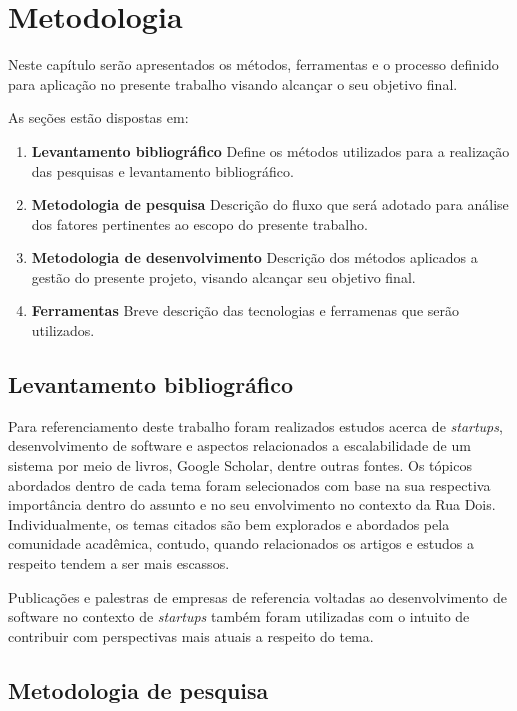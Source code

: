 \chapter{Metodologia}
\label{sec:Metodologia}

Neste capítulo serão apresentados os métodos, ferramentas e o processo definido
para aplicação no presente trabalho visando alcançar o seu objetivo final.

  As seções estão dispostas em:

  \begin{enumerate}
    \item \textbf{Levantamento bibliográfico} Define os métodos utilizados para
    a realização das pesquisas e levantamento bibliográfico.
    \item \textbf{Metodologia de pesquisa} Descrição do fluxo que será
    adotado para análise dos fatores pertinentes ao escopo do presente trabalho.
    \item \textbf{Metodologia de desenvolvimento} Descrição dos métodos
    aplicados a gestão do presente projeto, visando alcançar seu objetivo final.
    \item \textbf{Ferramentas} Breve descrição das tecnologias e ferramenas
    que serão utilizados.
  \end{enumerate}

\section{Levantamento bibliográfico}

Para referenciamento deste trabalho foram realizados estudos acerca de
\textit{startups}, desenvolvimento de software e aspectos relacionados
a escalabilidade de um sistema por meio de livros, Google Scholar, dentre
outras fontes. Os tópicos abordados dentro de cada tema foram selecionados
com base na sua respectiva importância dentro do assunto e no seu envolvimento
no contexto da Rua Dois. Individualmente, os temas citados são bem explorados e
abordados pela comunidade acadêmica, contudo, quando relacionados os artigos e
estudos a respeito tendem a ser mais escassos.

Publicações e palestras de empresas de referencia voltadas ao desenvolvimento de
software no contexto de \textit{startups} também foram utilizadas com o intuito de
contribuir com perspectivas mais atuais a respeito do tema.

\section{Metodologia de pesquisa}
\label{sec:MetodologiaPesquisa}

